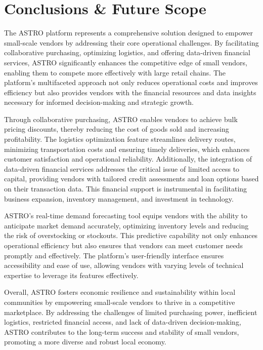 \chapter{Conclusions \& Future Scope}

The ASTRO platform represents a comprehensive solution designed to empower small-scale vendors by addressing their core operational challenges. By facilitating collaborative purchasing, optimizing logistics, and offering data-driven financial services, ASTRO significantly enhances the competitive edge of small vendors, enabling them to compete more effectively with large retail chains. The platform’s multifaceted approach not only reduces operational costs and improves efficiency but also provides vendors with the financial resources and data insights necessary for informed decision-making and strategic growth.

Through collaborative purchasing, ASTRO enables vendors to achieve bulk pricing discounts, thereby reducing the cost of goods sold and increasing profitability. The logistics optimization feature streamlines delivery routes, minimizing transportation costs and ensuring timely deliveries, which enhances customer satisfaction and operational reliability. Additionally, the integration of data-driven financial services addresses the critical issue of limited access to capital, providing vendors with tailored credit assessments and loan options based on their transaction data. This financial support is instrumental in facilitating business expansion, inventory management, and investment in technology.

ASTRO’s real-time demand forecasting tool equips vendors with the ability to anticipate market demand accurately, optimizing inventory levels and reducing the risk of overstocking or stockouts. This predictive capability not only enhances operational efficiency but also ensures that vendors can meet customer needs promptly and effectively. The platform’s user-friendly interface ensures accessibility and ease of use, allowing vendors with varying levels of technical expertise to leverage its features effectively.

Overall, ASTRO fosters economic resilience and sustainability within local communities by empowering small-scale vendors to thrive in a competitive marketplace. By addressing the challenges of limited purchasing power, inefficient logistics, restricted financial access, and lack of data-driven decision-making, ASTRO contributes to the long-term success and stability of small vendors, promoting a more diverse and robust local economy.

